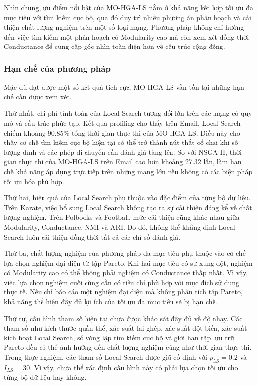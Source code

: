 \documentclass[14pt,a4paper]{extarticle}
\begin{document}
Nhìn chung, ưu điểm nổi bật của MO-HGA-LS nằm ở khả năng kết hợp tối ưu đa mục tiêu với tìm kiếm cục bộ, qua đó duy trì nhiều phương án phân hoạch và cải thiện chất lượng nghiệm trên một số loại mạng. Phương pháp không chỉ hướng đến việc tìm kiếm một phân hoạch có Modularity cao mà còn xem xét đồng thời Conductance để cung cấp góc nhìn toàn diện hơn về cấu trúc cộng đồng.

\subsubsection{Hạn chế của phương pháp}

Mặc dù đạt được một số kết quả tích cực, MO-HGA-LS vẫn tồn tại những hạn chế cần được xem xét.

Thứ nhất, chi phí tính toán của Local Search tương đối lớn trên các mạng có quy mô và cấu trúc phức tạp. Kết quả profiling cho thấy trên Email, Local Search chiếm khoảng 90.85\% tổng thời gian thực thi của MO-HGA-LS. Điều này cho thấy cơ chế tìm kiếm cục bộ hiện tại có thể trở thành nút thắt cổ chai khi số lượng đỉnh và các phép di chuyển cần đánh giá tăng lên. So với NSGA-II, thời gian thực thi của MO-HGA-LS trên Email cao hơn khoảng 27.32 lần, làm hạn chế khả năng áp dụng trực tiếp trên những mạng lớn nếu không có các biện pháp tối ưu hóa phù hợp.

Thứ hai, hiệu quả của Local Search phụ thuộc vào đặc điểm của từng bộ dữ liệu. Trên Karate, việc bổ sung Local Search không tạo ra sự cải thiện đáng kể về chất lượng nghiệm. Trên Polbooks và Football, mức cải thiện cũng khác nhau giữa Modularity, Conductance, NMI và ARI. Do đó, không thể khẳng định Local Search luôn cải thiện đồng thời tất cả các chỉ số đánh giá.

Thứ ba, chất lượng nghiệm của phương pháp đa mục tiêu phụ thuộc vào cơ chế lựa chọn nghiệm đại diện từ tập Pareto. Khi hai mục tiêu có sự xung đột, nghiệm có Modularity cao có thể không phải nghiệm có Conductance thấp nhất. Vì vậy, việc lựa chọn nghiệm cuối cùng cần có tiêu chí phù hợp với mục đích sử dụng thực tế. Nếu chỉ báo cáo một nghiệm đại diện mà không phân tích tập Pareto, khả năng thể hiện đầy đủ lợi ích của tối ưu đa mục tiêu sẽ bị hạn chế.

Thứ tư, cấu hình tham số hiện tại chưa được khảo sát đầy đủ về độ nhạy. Các tham số như kích thước quần thể, xác suất lai ghép, xác suất đột biến, xác suất kích hoạt Local Search, số vòng lặp tìm kiếm cục bộ và giới hạn tập lưu trữ Pareto đều có thể ảnh hưởng đến chất lượng nghiệm cũng như thời gian thực thi. Trong thực nghiệm, các tham số Local Search được giữ cố định với $p_{LS}=0.2$ và $I_{LS}=30$. Vì vậy, chưa thể xác định cấu hình này có phải lựa chọn tối ưu cho từng bộ dữ liệu hay không.
\end{document}
